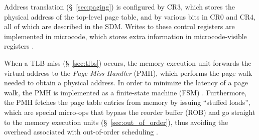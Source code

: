 
Address translation (\S~\ref{sec:paging}) is configured by CR3, which stores
the physical address of the top-level page table, and by various bits in CR0
and CR4, all of which are described in the SDM. Writes to these control
registers are implemented in microcode, which stores extra information in
microcode-visible registers \cite{intel2009pipeline}.


When a TLB miss (\S~\ref{sec:tlbs}) occurs, the memory execution unit forwards
the virtual address to the \textit{Page Miss Handler} (PMH), which performs the
page walk needed to obtain a physical address. In order to minimize the latency
of a page walk, the PMH is implemented as a finite-state machine (FSM)
\cite{hildesheim2014ptm, raikin2014tlb}. Furthermore, the PMH fetches the
page table entries from memory by issuing ``stuffed loads'', which are special
micro-ops that bypass the reorder buffer (ROB) and go straight to the memory
execution units (\S~\ref{sec:out_of_order}), thus avoiding the overhead
associated with out-of-order scheduling
\cite{intel1997pmh, intel1997microspace, hildesheim2014ptm}.



